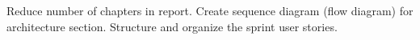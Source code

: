 
\nextItem Reduce number of chapters in report.
\nextItem Create sequence diagram (flow diagram) for architecture section.
\nextItem Structure and organize the sprint user stories.

